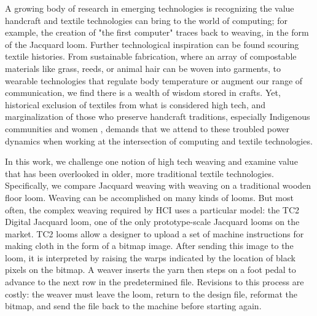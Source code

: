 
\label{ch_lp_intro}

A growing body of research in emerging technologies is recognizing the value handcraft and textile technologies can bring to the world of computing; for example, the creation of "the first computer" traces back to weaving, in the form of the Jacquard loom. \cite{harlizius-kluck_weaving_2017} Further technological inspiration can be found scouring textile histories. From sustainable fabrication, where an array of compostable materials like grass, reeds, or animal hair can be woven into garments, to wearable technologies that regulate body temperature or augment our range of communication, we find there is a wealth of wisdom stored in crafts. Yet, historical exclusion of textiles from what is considered high tech, and marginalization of those who preserve handcraft traditions, especially Indigenous communities and women \cite{flores_weaving_2021, muskrat_magazine_indigenous_2013, rosner_making_2018}, demands that we attend to these troubled power dynamics when working at the intersection of computing and textile technologies.

In this work, we challenge one notion of high tech weaving and examine value that has been overlooked in older, more traditional textile technologies. Specifically, we compare Jacquard weaving with weaving on a traditional wooden floor loom. Weaving can be accomplished on many kinds of looms. But most often, the complex weaving required by HCI uses a particular model: the TC2 Digital Jacquard loom, one of the only prototype-scale Jacquard looms on the market. TC2 looms allow a designer to upload a set of machine instructions for making cloth in the form of a bitmap image. After sending this image to the loom, it is interpreted by raising the warps indicated by the location of black pixels on the bitmap. A weaver inserts the yarn then steps on a foot pedal to advance to the next row in the predetermined file. Revisions to this process are costly: the weaver must leave the loom, return to the design file, reformat the bitmap, and send the file back to the machine before starting again. 

